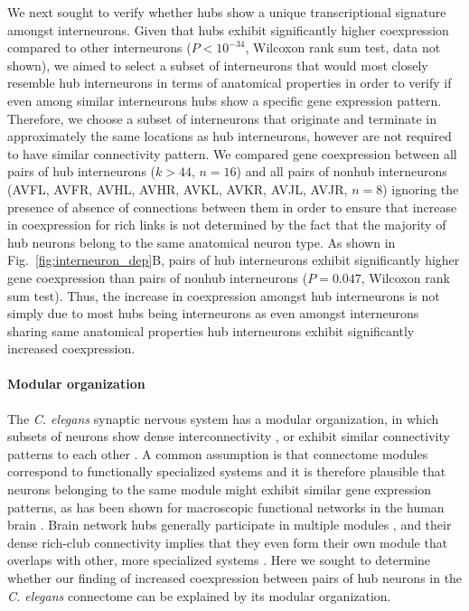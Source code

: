 \documentclass[10pt,letterpaper]{article}
\begin{document}
We next sought to verify whether hubs show a unique transcriptional signature amongst interneurons.
Given that hubs exhibit significantly higher coexpression compared to other interneurons ($P < 10^{-34}$, Wilcoxon rank sum test, data not shown), we aimed to select a subset of interneurons that would most closely resemble hub interneurons in terms of anatomical properties in order to verify if even among similar interneurons hubs show a specific gene expression pattern.
Therefore, we choose a subset of interneurons that originate and terminate in approximately the same locations as hub interneurons, however are not required to have similar connectivity pattern.
We compared gene coexpression between all pairs of hub interneurons ($\textit{k}>44$, $n=16$) and all pairs of nonhub interneurons (AVFL, AVFR, AVHL, AVHR, AVKL, AVKR, AVJL, AVJR, $n=8$) ignoring the presence of absence of connections between them in order to ensure that increase in coexpression for rich links is not determined by the fact that the majority of hub neurons belong to the same anatomical neuron type.
As shown in Fig.~\ref{fig:interneuron_dep}B, pairs of hub interneurons exhibit significantly higher gene coexpression than pairs of nonhub interneurons ($P = 0.047$, Wilcoxon rank sum test).
Thus, the increase in coexpression amongst hub interneurons is not simply due to most hubs being interneurons as even amongst interneurons sharing same anatomical properties hub interneurons exhibit significantly increased coexpression.

\paragraph{Modular organization}
The \emph{C. elegans} synaptic nervous system has a modular organization, in which subsets of neurons show dense interconnectivity \cite{Kim2014, Pan:2010jt, Bassett2010}, or exhibit similar connectivity patterns to each other \cite{Achacoso:1992ay, Pavlovic2014}.
A common assumption is that connectome modules correspond to functionally specialized systems and it is therefore plausible that neurons belonging to the same module might exhibit similar gene expression patterns, as has been shown for macroscopic functional networks in the human brain \cite{Richiardi2015}.
Brain network hubs generally participate in multiple modules \cite{vandenHeuvel:2013ij, deReus:2014cz}, and their dense rich-club connectivity implies that they even form their own module that overlaps with other, more specialized systems \cite{Fornito:2015dq, deReus:2013cy, ZamoraLopez:2010hy}.
Here we sought to determine whether our finding of increased coexpression between pairs of hub neurons in the \emph{C. elegans} connectome can be explained by its modular organization.
\end{document}
